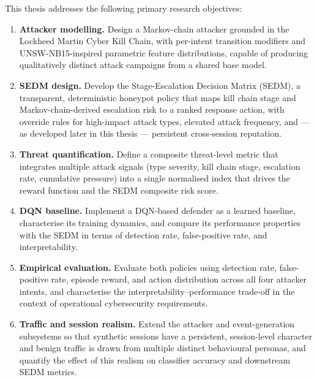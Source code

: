 This thesis addresses the following primary research objectives:

\begin{enumerate}
  \item \textbf{Attacker modelling.}
        Design a Markov-chain attacker grounded in the Lockheed Martin
        Cyber Kill Chain, with per-intent transition modifiers and
        UNSW-NB15-inspired parametric feature distributions, capable of
        producing qualitatively distinct attack campaigns from a shared
        base model.

  \item \textbf{SEDM design.}
        Develop the Stage-Escalation Decision Matrix (SEDM), a
        transparent, deterministic honeypot policy that maps kill chain
        stage and Markov-chain-derived escalation risk to a ranked
        response action, with override rules for high-impact attack types,
        elevated attack frequency, and --- as developed later in this
        thesis --- persistent cross-session reputation.

  \item \textbf{Threat quantification.}
        Define a composite threat-level metric that integrates multiple
        attack signals (type severity, kill chain stage, escalation rate,
        cumulative pressure) into a single normalised index that drives
        the reward function and the SEDM composite risk score.

  \item \textbf{DQN baseline.}
        Implement a DQN-based defender as a learned baseline, characterise
        its training dynamics, and compare its performance properties
        with the SEDM in terms of detection rate, false-positive rate,
        and interpretability.

  \item \textbf{Empirical evaluation.}
        Evaluate both policies using detection rate, false-positive rate,
        episode reward, and action distribution across all four attacker
        intents, and characterise the interpretability--performance
        trade-off in the context of operational cybersecurity requirements.

  \item \textbf{Traffic and session realism.}
        Extend the attacker and event-generation subsystems so that
        synthetic sessions have a persistent, session-level character and
        benign traffic is drawn from multiple distinct behavioural
        personas, and quantify the effect of this realism on classifier
        accuracy and downstream SEDM metrics.


\end{enumerate}
